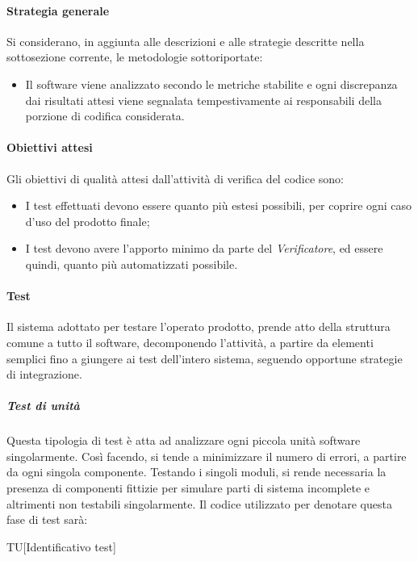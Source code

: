 		\paragraph{Strategia generale}
		Si considerano, in aggiunta alle descrizioni e alle strategie descritte nella sottosezione corrente, le metodologie sottoriportate:
		
		\begin{itemize}
			\item Il software viene analizzato secondo le metriche stabilite e ogni discrepanza dai risultati attesi viene segnalata tempestivamente ai responsabili della porzione di codifica considerata.
		\end{itemize}
		
		\paragraph{Obiettivi attesi}
		Gli obiettivi di qualità attesi dall'attività di verifica del codice sono:
		
		\begin{itemize}
			\item I test effettuati devono essere quanto più estesi possibili, per coprire ogni caso d'uso del prodotto finale;
			\item I test devono avere l'apporto minimo da parte del \textit{Verificatore}, ed essere quindi, quanto più automatizzati possibile.
		\end{itemize}
		
		\paragraph{Test}
		Il sistema adottato per testare l'operato prodotto, prende atto della struttura comune a tutto il software, decomponendo l'attività, a partire da elementi semplici fino a giungere ai test dell'intero sistema, seguendo opportune strategie di integrazione.
		
		\subparagraph{Test di unità}
		Questa tipologia di test è atta ad analizzare ogni piccola unità software singolarmente. Così facendo, si tende a minimizzare il numero di errori, a partire da ogni singola componente. Testando i singoli moduli, si rende necessaria la presenza di componenti fittizie per simulare parti di sistema incomplete e altrimenti non testabili singolarmente. Il codice utilizzato per denotare questa fase di test sarà:
		
		\begin{center}
			TU[Identificativo test]
		\end{center}
	
